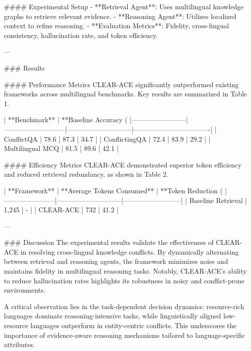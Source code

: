 #### Experimental Setup
- **Retrieval Agent**: Uses multilingual knowledge graphs to retrieve relevant evidence.
- **Reasoning Agent**: Utilizes localized context to refine reasoning.
- **Evaluation Metrics**: Fidelity, cross-lingual consistency, hallucination rate, and token efficiency.

---

### Results

#### Performance Metrics
CLEAR-ACE significantly outperformed existing frameworks across multilingual benchmarks. Key results are summarized in Table 1.

| **Benchmark**         | **Baseline Accuracy (%
|------------------------|---------------------------|-----------------------------|----------------------------------|
| ConflictQA             | 78.6                     | 87.3                        | 34.7                             |  
| ConflictingQA          | 72.4                     | 83.9                        | 29.2                             |  
| Multilingual MCQ       | 81.5                     | 89.6                        | 42.1                             |  

#### Efficiency Metrics
CLEAR-ACE demonstrated superior token efficiency and reduced retrieval redundancy, as shown in Table 2.

| **Framework**         | **Average Tokens Consumed** | **Token Reduction (%
|-----------------------|-----------------------------|--------------------------|
| Baseline Retrieval    | 1,245                      | -                        |
| CLEAR-ACE             | 732                        | 41.2                     |

---

### Discussion
The experimental results validate the effectiveness of CLEAR-ACE in resolving cross-lingual knowledge conflicts. By dynamically alternating between retrieval and reasoning agents, the framework minimizes noise and maintains fidelity in multilingual reasoning tasks. Notably, CLEAR-ACE's ability to reduce hallucination rates highlights its robustness in noisy and conflict-prone environments.

A critical observation lies in the task-dependent decision dynamics: resource-rich languages dominate reasoning-intensive tasks, while linguistically aligned low-resource languages outperform in entity-centric conflicts. This underscores the importance of evidence-aware reasoning mechanisms tailored to language-specific attributes.

